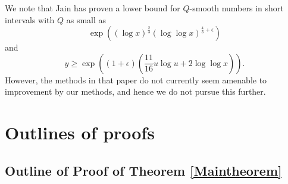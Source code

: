 \documentclass{amsart}
\begin{document}
We note that Jain \cite{Ja} has proven a lower bound for $Q$-smooth numbers in short intervals with $Q$ as small as $$\exp\left((\log x)^{\frac 23}(\log\log x)^{\frac 43+\epsilon}\right)$$ and $$y\geq \exp\left((1+\epsilon)\left(\frac{11}{16}u\log u+2\log\log x\right)\right).$$
However, the methods in that paper do not currently seem amenable to improvement by our methods, and hence we do not pursue this further.

\section{Outlines of proofs}
\subsection{Outline of Proof of Theorem \ref{Maintheorem}}
\end{document}
